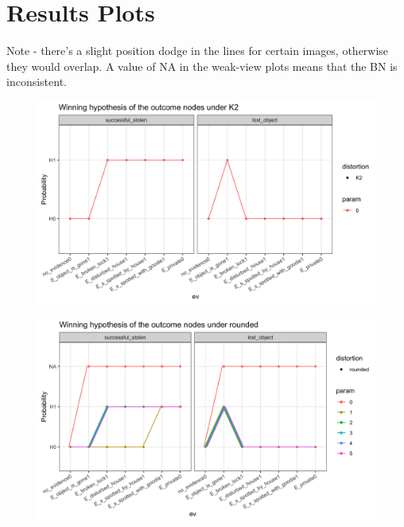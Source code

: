 \documentclass[11pt]{amsart}
\begin{document}
\section{Results Plots}
 {\tiny Note - there's a slight position dodge in the lines for certain images, otherwise they would overlap. A value of NA in the weak-view plots means that the BN is inconsistent.}
\begin{figure}[htbp]
\begin{center}
\includegraphics[scale=0.15]{images/K2Weak.png}
\label{default}
\end{center}
\end{figure}
\begin{figure}[htbp]
\begin{center}
\includegraphics[scale=0.15]{images/roundedWeak.png}
\label{default}
\end{center}
\end{figure}
\end{document}
